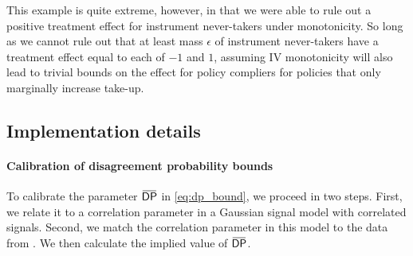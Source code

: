 \documentclass[12pt]{article}%
\theoremstyle{definition}
\newcommand\1{\operatorname{I}\indicatorfence}
\newcommand{\overbar}[1]{\mkern 1.5mu\overline{\mkern-1.5mu#1\mkern-1.5mu}%
  \mkern 1.5mu}%
\newcommand{\DP}{\mathsf{DP}}
\begin{document}
\begin{appendices}
This example is quite extreme, however, in that we were able to rule out a positive treatment effect for instrument never-takers under monotonicity. So long as we cannot rule out that at least mass $\epsilon$ of instrument never-takers have a treatment effect equal to each of $-1$ and $1$, assuming IV monotonicity will also lead to trivial bounds on the effect for policy compliers for policies that only marginally increase take-up.



\subsection{Implementation details}\label{sec:impl-deta}

\paragraph{Calibration of disagreement probability bounds}

To calibrate the parameter $\overbar{\DP}$ in \cref{eq:dp_bound}, we proceed in two steps. First, we relate it to a correlation parameter
in a Gaussian signal model with correlated signals. Second, we match the correlation parameter in this model to the data from \textcite{sigstad_monotonicity_2023}. We then calculate the implied value of $\overbar{\DP}$.


\end{appendices}
\end{document}
